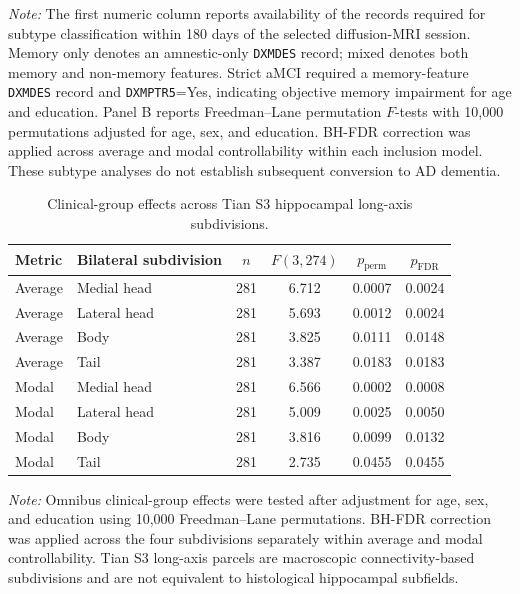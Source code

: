 \documentclass{article}
\providecommand{\DIFchgbeginFL}{}
\providecommand{\DIFchgendFL}{}
\begin{document}
\begin{table}[!htbp]
\vspace{1mm}
 \DIFchgbeginFL \footnotesize{\textit{Note:} The first numeric column reports availability of the records required for subtype classification within 180 days of the selected diffusion-MRI session. Memory only denotes an amnestic-only \texttt{DXMDES} record; mixed denotes both memory and non-memory features. Strict aMCI required a memory-feature \texttt{DXMDES} record and \texttt{DXMPTR5}=Yes, indicating objective memory impairment for age and education. Panel B reports Freedman--Lane permutation \(F\)-tests with 10,000 permutations adjusted for age, sex, and education. BH-FDR correction was applied across average and modal controllability within each inclusion model. These subtype analyses do not establish subsequent conversion to AD dementia.}
\DIFchgendFL \end{table}

\begin{table}[!htbp]
\centering
\caption{Clinical-group effects across Tian S3 hippocampal long-axis subdivisions.}
\label{tab:tableS2}
\footnotesize
\setlength{\tabcolsep}{5pt}

\begin{tabular}{@{}llcccc@{}}
\toprule
\textbf{Metric} &
\textbf{Bilateral subdivision} &
\textbf{$n$} &
\textbf{$F(3,274)$} &
\textbf{$p_{\mathrm{perm}}$} &
\textbf{$p_{\mathrm{FDR}}$} \\
\midrule
Average & Medial head  & 281 & 6.712 & 0.0007 & 0.0024 \\
Average & Lateral head & 281 & 5.693 & 0.0012 & 0.0024 \\
Average & Body         & 281 & 3.825 & 0.0111 & 0.0148 \\
Average & Tail         & 281 & 3.387 & 0.0183 & 0.0183 \\
\midrule
Modal  & Medial head  & 281 & 6.566 & 0.0002 & 0.0008 \\
Modal  & Lateral head & 281 & 5.009 & 0.0025 & 0.0050 \\
Modal  & Body         & 281 & 3.816 & 0.0099 & 0.0132 \\
Modal  & Tail         & 281 & 2.735 & 0.0455 & 0.0455 \\
\bottomrule
\end{tabular}

\vspace{1mm}

\footnotesize{\textit{Note:} Omnibus clinical-group effects were tested after
adjustment for age, sex, and education using 10,000 Freedman--Lane
permutations. BH-FDR correction was applied across the four subdivisions
separately within average and modal controllability. Tian S3 long-axis
parcels are macroscopic connectivity-based subdivisions and are not
equivalent to histological hippocampal subfields.}

\end{table}
\end{document}
